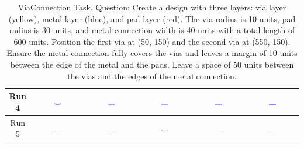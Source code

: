 \begin{table}[H]
\begin{tabular}{|c|c|c|c|c|c|}
    Run 4 & \includegraphics[width=0.15\textwidth]{./run_4/png/gpt-4o_results/ViaConnection.png} & \includegraphics[width=0.15\textwidth]{./run_4/png/claude-3-5-sonnet-20240620_results/ViaConnection.png} & \includegraphics[width=0.15\textwidth]{./run_4/png/watsonx_meta-llama_llama-3-1-70b-instruct_results/ViaConnection.png} & \includegraphics[width=0.15\textwidth]{./run_4/png/watsonx_meta-llama_llama-3-405b-instruct_results/ViaConnection.png} & \includegraphics[width=0.15\textwidth]{./run_4/png/o1-preview_results/ViaConnection.png} \\
    \hline
    Run 5 & \includegraphics[width=0.15\textwidth]{./run_5/png/gpt-4o_results/ViaConnection.png} & \includegraphics[width=0.15\textwidth]{./run_5/png/claude-3-5-sonnet-20240620_results/ViaConnection.png} & \includegraphics[width=0.15\textwidth]{./run_5/png/watsonx_meta-llama_llama-3-1-70b-instruct_results/ViaConnection.png} & \includegraphics[width=0.15\textwidth]{./run_5/png/watsonx_meta-llama_llama-3-405b-instruct_results/ViaConnection.png} & \includegraphics[width=0.15\textwidth]{./run_5/png/o1-preview_results/ViaConnection.png} \\
    \hline
    \end{tabular}
    \caption{ViaConnection Task. Question: Create a design with three layers: via layer (yellow), metal layer (blue), and pad layer (red). The via radius is 10 units, pad radius is 30 units, and metal connection width is 40 units with a total length of 600 units. Position the first via at (50, 150) and the second via at (550, 150). Ensure the metal connection fully covers the vias and leaves a margin of 10 units between the edge of the metal and the pads. Leave a space of 50 units between the vias and the edges of the metal connection.}
\end{table}

